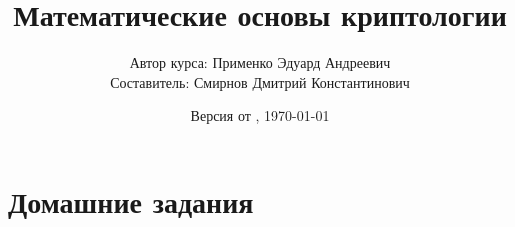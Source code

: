\documentclass[a4paper,11pt,openany]{book}
\title{Математические основы криптологии}
\author{Автор курса: Применко Эдуард Андреевич \\ 
		Составитель: Смирнов Дмитрий Константинович}
\date{Версия от \currenttime, \today}
\begin{document}
\maketitle
\tableofcontents

\mainmatter
\chapter{Домашние задания}







%
\end{document}
